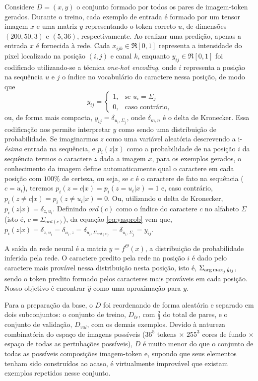 Considere $D = {(x, y)}$ o conjunto formado por todos os pares de imagem-token gerados. Durante o treino, cada exemplo de entrada é formado por um tensor imagem $x$ e uma matriz $y$ representando o token correto $u$, de dimensões $(200, 50, 3)$ e $(5, 36)$, respectivamente. Ao realizar uma predição, apenas a entrada $x$ é fornecida à rede. Cada $x_{ijk} \in \Re[0,1]$ representa a intensidade do pixel localizado na posição $(i,j)$ e canal $k$, enquanto $y_{ij} \in \Re[0,1]$ foi codificado utilizando-se a técnica \textit{one-hot encoding}, onde $i$ representa a posição na sequência $u$ e $j$ o índice no vocabulário do caractere nessa posição, de modo que 
\begin{equation}\label{eq:yasprob}
   y_{ij}= 
	\begin{cases}
		1,	& \text{se } u_i = \Sigma_j\\
		0,  & \text{caso contrário,}
	\end{cases}
\end{equation}
ou, de forma mais compacta, $y_{ij} = \delta_{u_i,\Sigma_j}$, onde $\delta_{m,n}$ é o delta de Kronecker. Essa codificação nos permite interpretar $y$ como sendo uma distribuição de probabilidade. Se imaginarmos $z$ como uma variável aleatória descrevendo a i-\textit{ésima} entrada na sequência, e $p_i(z|x)$ como a probabilidade de na posição $i$ da sequência termos o caractere $z$ dada a imagem $x$, para os exemplos gerados, o conhecimento da imagem define automaticamente qual o caractere em cada posição com $100\%$ de certeza, ou seja, se $c$ é o caractere de fato na sequência ($c = u_i$), teremos $p_i(z = c|x) = p_i(z = u_i|x) = 1$ e, caso contrário, $p_i(z \neq c|x) = p_i(z \neq u_i|x) = 0$. Ou, utilizando o delta de Kronecker, $p_i(z|x) = \delta_{z,u_i}$. Definindo $ord(c)$ como o índice do caractere $c$ no alfabeto $\Sigma$ (isto é, $c = \Sigma_{ord{(c)}}$), da equação \ref{eq:yasprob} vem que, $p_i(z|x) = \delta_{z,u_i} = \delta_{u_i, z} = \delta_{u_i, \Sigma_{ord(z)}} = \delta_{u_i,\Sigma_j} = y_{ij}$.

A saída da rede neural é a matriz $\hat{y} = f^{\Theta}(x)$, a distribuição de probabilidade inferida pela rede. O caractere predito pela rede na posição $i$ é dado pelo caractere mais provável nessa distribuição nesta posição, isto é, $\Sigma_{\operatorname*{arg\,max}_j \hat{y}_{ij}}$, sendo o token predito formado pelos caracteres mais prováveis em cada posição. Nosso objetivo é encontrar $\hat{y}$ como uma aproximação para $y$.

Para a preparação da base, o $D$ foi reordenando de forma aleatória e separado em dois subconjuntos: o conjunto de treino, $D_{tr}$, com $\frac{2}{3}$ do total de pares, e o conjunto de validação, $D_{val}$, com os demais exemplos. Devido à natureza combinatória do espaço de imagens possíveis ($36^5$ tokens $\times$ $255^3$ cores de fundo $\times$ espaço de todas as pertubações possíveis), $D$ é muito menor do que o conjunto de todas as possíveis composições imagem-token e, supondo que seus elementos tenham sido construídos ao acaso, é virtualmente improvável que existam exemplos repetidos nesse conjunto.

